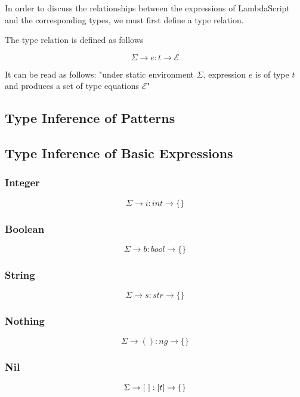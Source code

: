 \documentclass[titlepage]{article}
\begin{document}
In order to discuss the relationships between the expressions of LambdaScript and the corresponding types, we must first define a type relation.

The type relation is defined as follows

$$\Sigma \rightarrow e : t \rightarrow \mathcal{E}$$

It can be read as follows: "under static environment $\Sigma$, expression $e$ is of type $t$ and produces a set of type equations $\mathcal{E}$"

\subsection{Type Inference of Patterns}





\subsection{Type Inference of Basic Expressions}

\subsubsection{Integer}

$$\Sigma \rightarrow i : int \rightarrow \{\}$$

\subsubsection{Boolean}

$$\Sigma \rightarrow b : bool \rightarrow \{\}$$

\subsubsection{String}

$$\Sigma \rightarrow s : str \rightarrow \{\}$$

\subsubsection{Nothing}

$$\Sigma \rightarrow () : ng \rightarrow \{\}$$

\subsubsection{Nil}

$$\Sigma \rightarrow [ \text{ } ] : [\space t \space ] \rightarrow \{\}$$
\end{document}

